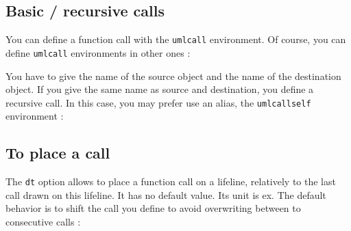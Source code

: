\documentclass[a4paper,11pt]{report}
\newcommand{\inputTikZ}[1]{%
  }%
\newcommand{\inputTikZ}[1]{%
    \texttt{[image: fig/\#1.pdf]}%
  }%
\begin{document}
\subsection{Basic / recursive calls}\label{ss.call}

You can define a function call with the {\tt umlcall} environment. Of course, you can define {\tt umlcall} environments in other ones :

\medskip

\begin{minipage}{0.4\textwidth}

\end{minipage}
\begin{minipage}{0.6\textwidth}
\begin{center}
\inputTikZ{call}
\end{center}
\end{minipage}

\medskip

You have to give the name of the source object and the name of the destination object. If you give the same name as source and destination, you define a recursive call. In this case, you may prefer use an alias, the {\tt umlcallself} environment :

\medskip

\begin{minipage}{0.5\textwidth}

\end{minipage}
\begin{minipage}{0.5\textwidth}
\begin{center}
\inputTikZ{callself}
\end{center}
\end{minipage}

\subsection{To place a call}\label{ss.calldt}

The {\tt dt} option allows to place a function call on a lifeline, relatively to the last call drawn on this lifeline. It has no default value. Its unit is ex. The default behavior is to shift the call you define to avoid overwriting between to consecutive calls :

\medskip

\begin{minipage}{0.5\textwidth}

\end{minipage}
\begin{minipage}{0.5\textwidth}
\begin{center}
\inputTikZ{calldt}
\end{center}
\end{minipage}
\end{document}
